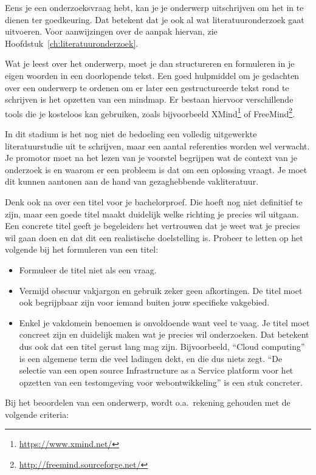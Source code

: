 Eens je een onderzoeksvraag hebt, kan je je onderwerp uitschrijven om het in te dienen ter goedkeuring. Dat betekent dat je ook al wat literatuuronderzoek gaat uitvoeren. Voor aanwijzingen over de aanpak hiervan, zie Hoofdstuk~\ref{ch:literatuuronderzoek}.

Wat je leest over het onderwerp, moet je dan structureren en formuleren in je eigen woorden in een doorlopende tekst. Een goed hulpmiddel om je gedachten over een onderwerp te ordenen om er later een gestructureerde tekst rond te schrijven is het opzetten van een mindmap. Er bestaan hiervoor verschillende tools die je kosteloos kan gebruiken, zoals bijvoorbeeld XMind\footnote{\url{https://www.xmind.net/}} of FreeMind\footnote{\url{http://freemind.sourceforge.net/}}.

In dit stadium is het nog niet de bedoeling een volledig uitgewerkte literatuurstudie uit te schrijven, maar een aantal referenties worden wel verwacht. Je promotor moet na het lezen van je voorstel begrijpen wat de context van je onderzoek is en waarom er een probleem is dat om een oplossing vraagt. Je moet dit kunnen aantonen aan de hand van gezaghebbende vakliteratuur.

Denk ook na over een titel voor je bachelorproef. Die hoeft nog niet definitief te zijn, maar een goede titel maakt duidelijk welke richting je precies wil uitgaan. Een concrete titel geeft je begeleiders het vertrouwen dat je weet wat je precies wil gaan doen en dat dit een realistische doelstelling is. Probeer te letten op het volgende bij het formuleren van een titel:

\begin{itemize}
  \item Formuleer de titel niet als een vraag.
  \item Vermijd obscuur vakjargon en gebruik zeker geen afkortingen. De titel moet ook begrijpbaar zijn voor iemand buiten jouw specifieke vakgebied.
  \item Enkel je vakdomein benoemen is onvoldoende want veel te vaag. Je titel moet concreet zijn en duidelijk maken wat je precies wil onderzoeken. Dat betekent dus ook dat een titel gerust lang mag zijn. Bijvoorbeeld, ``Cloud computing'' is een algemene term die veel ladingen dekt, en die dus niets zegt. ``De selectie van een open source Infrastructure as a Service platform voor het opzetten van een testomgeving voor webontwikkeling'' is een stuk concreter.
\end{itemize}

Bij het beoordelen van een onderwerp, wordt o.a.\ rekening gehouden met de volgende criteria:

